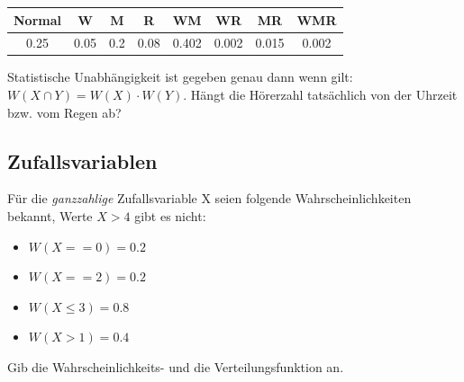 \documentclass[11pt, a4paper]{article}
\newif\ifshowsolution
\begin{document}
\vspace{\baselineskip}
\begin{tabular}{c|c|c|c|c|c|c|c}
	Normal & W & M & R & WM & WR & MR & WMR \\ \hline
	0.25 & 0.05 & 0.2 & 0.08 & 0.402 & 0.002 & 0.015 & 0.002
\end{tabular}

Statistische Unabhängigkeit ist gegeben genau dann wenn gilt: $W(X \cap Y) = W(X) \cdot W(Y)$. Hängt die Hörerzahl tatsächlich von der Uhrzeit bzw. vom Regen ab?

\ifshowsolution
\paragraph{Wenig Hörer und Morgens} Wir wählen also $W(W \cap M)$ als alle Fälle, in denen es sowohl Wenig Hörer gibt als auch die Vorlesungs Morgens statt findet. Dies wird mit den Einzelwahrscheinlichkeiten für $W(X) \cdot W(Y)$ gleich gesetzt.
\begin{align*}
	WM + WMR &\overset{!}{=} W \cdot M \\
	0.402 + 0.002 &= 0.05 \cdot 0.02 \\
	0.404 &\neq 0.001
\end{align*}
Die Hörerzahl und die Uhrzeit sind also abhängig.

\paragraph{Wenig Hörer und Regen} Selbes Spiel. Alle Fälle, in denen es Wenig Hörer und Regen gibt gleichsetzten mit dem Produkt der Einzelwahrscheinlichkeiten.
\begin{align*}
	WR + WMR &\overset{!}{=} W \cdot R \\
	0.002 + 0.002 &= 0.05 \cdot 0.08 \\
	0.004 &= 0,004
\end{align*}
Die Hörerzahl und das Wetter sind also unabhängig.
\fi

\subsection{Zufallsvariablen}
Für die \emph{ganzzahlige} Zufallsvariable X seien folgende Wahrscheinlichkeiten bekannt, Werte $X > 4$ gibt es nicht:
\begin{itemize}
	\item $W(X == 0) = 0.2$
	\item $W(X == 2) = 0.2$
	\item $W(X \leq 3) = 0.8$
	\item $W(X > 1) = 0.4$
\end{itemize}
Gib die Wahrscheinlichkeits- und die Verteilungsfunktion an.
\end{document}
